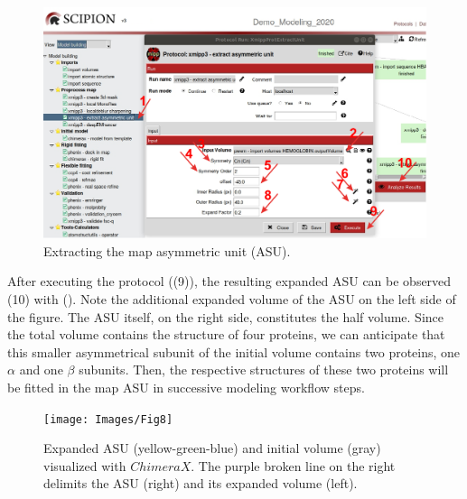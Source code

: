  \begin{figure}[H]
  \centering 
  \captionsetup{width=.9\linewidth} 
  \includegraphics[width=1\textwidth]
  {Images/Fig7}
  \caption{Extracting the map asymmetric unit (ASU).}
  \label{fig:extract_unit_cell}
  \end{figure}
  
After executing the protocol ((9)), the resulting expanded ASU can be observed (10) with \chimera (). Note the additional expanded volume of the  ASU on the left side of the figure. The ASU itself, on the right side, constitutes the half volume. Since the total volume contains the structure of four proteins, we can anticipate that this smaller asymmetrical subunit of the initial volume contains two proteins, one $\alpha$ and one $\beta$  subunits. Then, the respective structures of these two proteins will be fitted in the map ASU in successive modeling workflow steps. 
  
 \begin{figure}[H]
  \centering 
  \captionsetup{width=.7\linewidth} 
  \texttt{[image: Images/Fig8]}
  \caption{Expanded ASU (yellow-green-blue) and initial volume (gray) visualized with $ChimeraX$. The purple broken line on the right delimits the ASU (right) and its expanded volume (left).}
  \label{fig:chimera_visualization_unit_cell}
  \end{figure}
